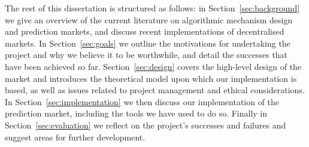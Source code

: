 The rest of this dissertation is structured as follows: in
Section~\ref{sec:background} we give an overview of the current literature on
algorithmic mechanism design and prediction markets, and discuss recent
implementations of decentralised markets. In Section~\ref{sec:goals} we outline
the motivations for undertaking the project and why we believe it to be
worthwhile, and detail the successes that have been achieved so far.
Section~\ref{sec:design} covers the high-level design of the market and
introduces the theoretical model upon which our implementation is based, as
well as issues related to project management and ethical considerations. In
Section~\ref{sec:implementation} we then discuss our implementation of the
prediction market, including the tools we have used to do so. Finally in
Section~\ref{sec:evaluation} we reflect on the project's successes and failures
and suggest areas for further development.
